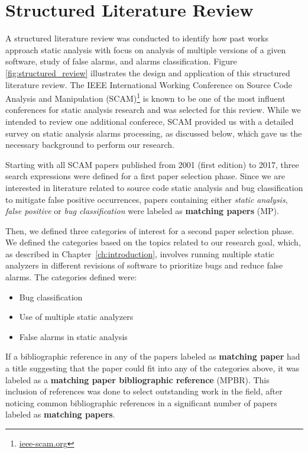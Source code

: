 \chapter{Structured Literature Review}
\label{ch:literature}

A structured literature review was conducted to identify how past works
approach static analysis with focus on analysis of multiple versions of a given
software, study of false alarms, and alarms classification. Figure
\ref{fig:structured_review} illustrates the design and application of this
structured literature review. The IEEE International Working Conference on
Source Code Analysis and Manipulation (SCAM)\footnote{\url{ieee-scam.org}} is
known to be one of the most influent conferences for static analysis research
and was selected for this review. While we intended to review one additional
conferece, SCAM provided us with a detailed survey on static analysis alarms
processing, as discussed below, which gave us the necessary background to
perform our research.



Starting with all SCAM papers published from 2001 (first edition) to 2017,
three search expressions were defined for a first paper selection phase. Since
we are interested in literature related to source code static analysis and  bug
classification to mitigate false positive occurrences, papers containing either
\textit{static analysis}, \textit{false positive} or \textit{bug
classification} were labeled as \textbf{matching papers} (MP).

Then, we defined three categories of interest for a second paper selection
phase. We defined the categories based on the topics related to our research
goal, which, as described in Chapter~\ref{ch:introduction}, involves running
multiple static analyzers in different revisions of software to prioritize bugs
and reduce false alarms. The categories defined were:

\begin{itemize}
\item Bug classification
\item Use of multiple static analyzers
\item False alarms in static analysis
\end{itemize}

If a bibliographic reference in any of the papers labeled as \textbf{matching
paper} had a title suggesting that the paper could fit into any of the
categories above, it was labeled as a \textbf{matching paper bibliographic
reference} (MPBR). This inclusion of references was done to select outstanding work in the field,
after noticing common bibliographic references in a significant number of
papers labeled as \textbf{matching papers}.

